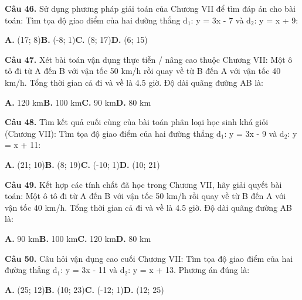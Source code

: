 \documentclass[11pt,a4paper]{article}
\begin{document}
\textbf{\color{primary} Câu 46.} Sử dụng phương pháp giải toán của Chương VII để tìm đáp án cho bài toán: Tìm tọa độ giao điểm của hai đường thẳng d$_1$: y = 3x - 7 và d$_2$: y = x + 9:\par
\hspace*{1.5em}\textbf{A.} (17; 8)\quad\quad \textbf{B.} (-8; 1)\quad\quad \textbf{C.} (8; 17)\quad\quad \textbf{D.} (6; 15)\par\vspace{2pt}
\textbf{\color{primary} Câu 47.} Xét bài toán vận dụng thực tiễn / nâng cao thuộc Chương VII: Một ô tô đi từ A đến B với vận tốc 50 km/h rồi quay về từ B đến A với vận tốc 40 km/h. Tổng thời gian cả đi và về là 4.5 giờ. Độ dài quãng đường AB là:\par
\hspace*{1.5em}\textbf{A.} 120 km\quad\quad \textbf{B.} 100 km\quad\quad \textbf{C.} 90 km\quad\quad \textbf{D.} 80 km\par\vspace{2pt}
\textbf{\color{primary} Câu 48.} Tìm kết quả cuối cùng của bài toán phân loại học sinh khá giỏi (Chương VII): Tìm tọa độ giao điểm của hai đường thẳng d$_1$: y = 3x - 9 và d$_2$: y = x + 11:\par
\hspace*{1.5em}\textbf{A.} (21; 10)\quad\quad \textbf{B.} (8; 19)\quad\quad \textbf{C.} (-10; 1)\quad\quad \textbf{D.} (10; 21)\par\vspace{2pt}
\textbf{\color{primary} Câu 49.} Kết hợp các tính chất đã học trong Chương VII, hãy giải quyết bài toán: Một ô tô đi từ A đến B với vận tốc 50 km/h rồi quay về từ B đến A với vận tốc 40 km/h. Tổng thời gian cả đi và về là 4.5 giờ. Độ dài quãng đường AB là:\par
\hspace*{1.5em}\textbf{A.} 90 km\quad\quad \textbf{B.} 100 km\quad\quad \textbf{C.} 120 km\quad\quad \textbf{D.} 80 km\par\vspace{2pt}
\textbf{\color{primary} Câu 50.} Câu hỏi vận dụng cao cuối Chương VII: Tìm tọa độ giao điểm của hai đường thẳng d$_1$: y = 3x - 11 và d$_2$: y = x + 13. Phương án đúng là:\par
\hspace*{1.5em}\textbf{A.} (25; 12)\quad\quad \textbf{B.} (10; 23)\quad\quad \textbf{C.} (-12; 1)\quad\quad \textbf{D.} (12; 25)\par\vspace{2pt}
\end{document}
